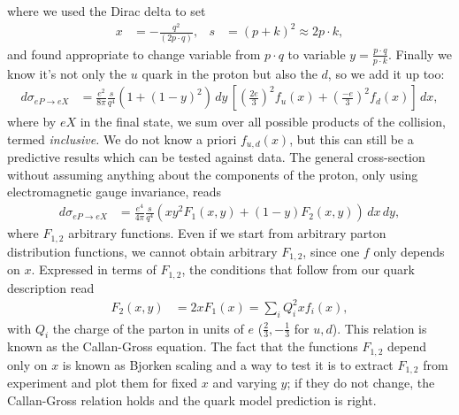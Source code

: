 \documentclass[relqm.tex]{subfiles}
\begin{document}
where we used the Dirac delta to set
\begin{align}
    x &= -\frac{q^2}{(2p\cdot q)}, & s &= (p+k)^2\approx 2p\cdot k,
\end{align}
and found appropriate to change variable from $p\cdot q$ to variable $y=\frac{p\cdot q}{p\cdot k}$.
Finally we know it's not only the $u$ quark in the proton but also the $d$, so we add it up too:
\begin{align}
    d\sigma_{eP\to eX} &= \frac{e^2}{8\pi}\frac{s}{q^4}\left(1+(1-y)^2\right)\,dy\,\left[\left(\frac{2e}{3}\right)^2f_u(x) + \left(\frac{-e}{3}\right)^2f_d(x)\right]\,dx,
\end{align}
where by $eX$ in the final state, we sum over all possible products of the collision, termed \emph{inclusive.}
We do not know a priori $f_{u,d}(x)$, but this can still be a predictive results which can be tested against data.
The general cross-section without assuming anything about the components of the proton, only using electromagnetic gauge invariance, reads
\begin{align}
    d\sigma_{eP\to eX} &= \frac{e^4}{4\pi}\frac{s}{q^4}\left(xy^2F_1(x,y) + (1-y)F_2(x,y)\right)\,dx\,dy,
\end{align}
where $F_{1,2}$ arbitrary functions. 
Even if we start from arbitrary parton distribution functions, we cannot obtain arbitrary $F_{1,2}$, since one $f$ only depends on $x$. 
Expressed in terms of $F_{1,2}$, the conditions that follow from our quark description read
\begin{align}
    F_2(x,y) &= 2xF_1(x) = \sum_i Q_i^2 xf_i(x),
\end{align}
with $Q_i$ the charge of the parton in units of $e$ ($\frac23,-\frac13$ for $u,d$).
This relation is known as the Callan-Gross equation. 
The fact that the functions $F_{1,2}$ depend only on $x$ is known as Bjorken scaling and a way to test it is to extract $F_{1,2}$ from experiment and plot them for fixed $x$ and varying $y$; if they do not change, the Callan-Gross relation holds and the quark model prediction is right.
\end{document}
